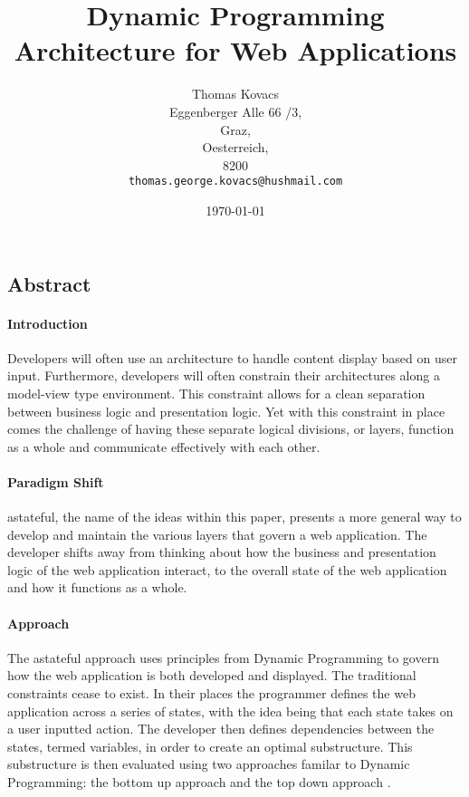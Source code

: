 \documentclass[11pt,twocolumn]{article}
\begin{document}
\title{Dynamic Programming Architecture for Web Applications}
\author{Thomas Kovacs\\
  Eggenberger Alle 66 /3,\\
  Graz,\\
  Oesterreich,\\
  8200\\
  \texttt{thomas.george.kovacs@hushmail.com}}
\date{\today}
\maketitle
\begin{center}
\section*{Abstract}
\end{center}
\paragraph{Introduction}
Developers will often use an architecture to handle content display based on user input. Furthermore, developers will often constrain their architectures along a model-view type environment. This constraint allows for a clean separation between business logic and presentation logic. Yet with this constraint in place comes the challenge of having these separate logical divisions, or layers, function as a whole and communicate effectively with each other.
\paragraph{Paradigm Shift}
astateful, the name of the ideas within this paper, presents a more general way to develop and maintain the various layers that govern a web application. The developer shifts away from thinking about how the business and presentation logic of the web application interact, to the overall state of the web application and how it functions as a whole.
\paragraph{Approach}
The astateful approach uses principles from Dynamic Programming to govern how the web application is both developed and displayed. The traditional constraints cease to exist. In their places the programmer defines the web application across a series of states, with the idea being that each state takes on a user inputted action. The developer then defines dependencies between the states, termed variables, in order to create an optimal substructure. This substructure is then evaluated using two approaches familar to Dynamic Programming: the bottom up approach and the top down approach \cite{dp}.
\end{document}
